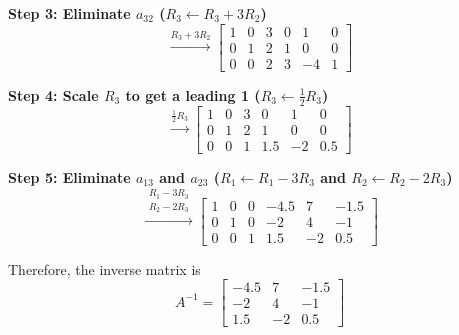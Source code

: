 \documentclass[../linear-algebra.tex]{subfiles}
\begin{document}
\textbf{Step 3: Eliminate $a_{32}$ ($R_3 \leftarrow R_3 + 3R_2$)}
\[
\xrightarrow{R_3 + 3R_2}
\left[ \begin{array}{ccc|ccc}
1 & 0 & 3 & 0 & 1 & 0 \\
0 & 1 & 2 & 1 & 0 & 0 \\
0 & 0 & 2 & 3 & -4 & 1
\end{array} \right]
\]

\textbf{Step 4: Scale $R_3$ to get a leading 1 ($R_3 \leftarrow \frac{1}{2}R_3$)}
\[
\xrightarrow{\frac{1}{2}R_3}
\left[ \begin{array}{ccc|ccc}
1 & 0 & 3 & 0 & 1 & 0 \\
0 & 1 & 2 & 1 & 0 & 0 \\
0 & 0 & 1 & 1.5 & -2 & 0.5
\end{array} \right]
\]

\textbf{Step 5: Eliminate $a_{13}$ and $a_{23}$ ($R_1 \leftarrow R_1 - 3R_3$ and $R_2 \leftarrow R_2 - 2R_3$)}
\[
\xrightarrow{\substack{R_1 - 3R_3 \\ R_2 - 2R_3}}
\left[ \begin{array}{ccc|ccc}
1 & 0 & 0 & -4.5 & 7 & -1.5 \\
0 & 1 & 0 & -2 & 4 & -1 \\
0 & 0 & 1 & 1.5 & -2 & 0.5
\end{array} \right]
\]

Therefore, the inverse matrix is
\[
A^{-1} = \begin{bmatrix}
-4.5 & 7 & -1.5 \\
-2 & 4 & -1 \\
1.5 & -2 & 0.5
\end{bmatrix}
\]

\newpage
\end{document}
